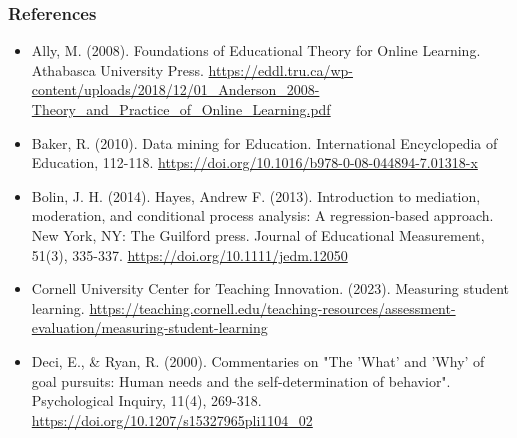 \documentclass{beamer}
\begin{document}
\begin{frame}
  \frametitle{References}
  \begin{multicols}{2}
      \footnotesize{
      \begin{itemize}
          \item Ally, M. (2008). Foundations of Educational Theory for Online Learning. Athabasca University Press. \url{https://eddl.tru.ca/wp-content/uploads/2018/12/01_Anderson_2008-Theory_and_Practice_of_Online_Learning.pdf}
          \item Baker, R. (2010). Data mining for Education. International Encyclopedia of Education, 112-118. \url{https://doi.org/10.1016/b978-0-08-044894-7.01318-x}
          \item Bolin, J. H. (2014). Hayes, Andrew F. (2013). Introduction to mediation, moderation, and conditional process analysis: A regression-based approach. New York, NY: The Guilford press. Journal of Educational Measurement, 51(3), 335-337. \url{https://doi.org/10.1111/jedm.12050}
          \item Cornell University Center for Teaching Innovation. (2023). Measuring student learning. \url{https://teaching.cornell.edu/teaching-resources/assessment-evaluation/measuring-student-learning}
          \item Deci, E., \& Ryan, R. (2000). Commentaries on "The 'What' and 'Why' of goal pursuits: Human needs and the self-determination of behavior". Psychological Inquiry, 11(4), 269-318. \url{https://doi.org/10.1207/s15327965pli1104_02}
      \end{itemize}
      }
  \end{multicols}
\end{frame}
\end{document}
